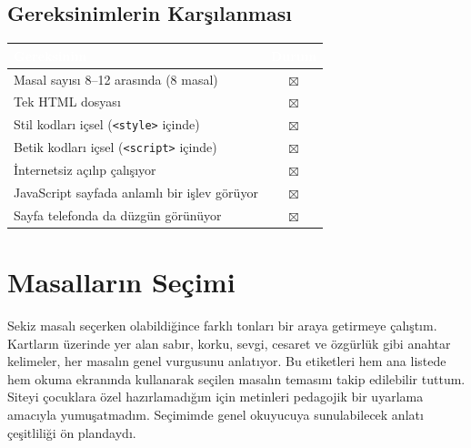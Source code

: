 \documentclass[12pt,a4paper]{article}
\begin{document}
\subsection{Gereksinimlerin Karşılanması}
\begin{center}
\begin{tabular}{@{}p{8.2cm}c@{}}
\toprule
\rowcolor{ana}\textcolor{white}{\textbf{Gereksinim}} & \textcolor{white}{\textbf{Durum}} \\
\midrule
Masal sayısı 8--12 arasında (8 masal)         & $\boxtimes$ \\
Tek HTML dosyası                                    & $\boxtimes$ \\
Stil kodları içsel (\texttt{<style>} içinde)        & $\boxtimes$ \\
Betik kodları içsel (\texttt{<script>} içinde)      & $\boxtimes$ \\
İnternetsiz açılıp çalışıyor                        & $\boxtimes$ \\
JavaScript sayfada anlamlı bir işlev görüyor        & $\boxtimes$ \\
Sayfa telefonda da düzgün görünüyor                 & $\boxtimes$ \\
\bottomrule
\end{tabular}
\end{center}


\section{Masalların Seçimi}

Sekiz masalı seçerken olabildiğince farklı tonları bir araya getirmeye çalıştım. Kartların üzerinde yer alan sabır, korku, sevgi, cesaret ve özgürlük gibi anahtar kelimeler, her masalın genel vurgusunu anlatıyor. Bu etiketleri hem ana listede hem okuma ekranında kullanarak seçilen masalın temasını takip edilebilir tuttum. Siteyi çocuklara özel hazırlamadığım için metinleri pedagojik bir uyarlama amacıyla yumuşatmadım. Seçimimde genel okuyucuya sunulabilecek anlatı çeşitliliği ön plandaydı.
\end{document}
